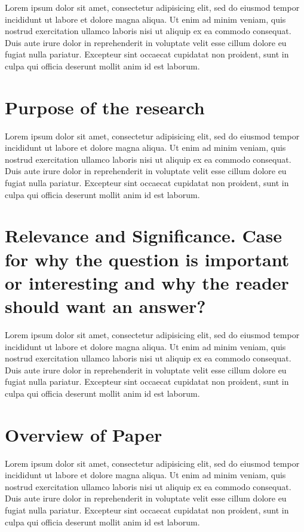 \documentclass[12pt,oneside,letterpaper,titlepage]{report}
\begin{document}
Lorem ipsum dolor sit amet, consectetur adipisicing elit, sed do eiusmod tempor incididunt ut labore et dolore magna aliqua. Ut enim ad minim veniam, quis nostrud exercitation ullamco laboris nisi ut aliquip ex ea commodo consequat. Duis aute irure dolor in reprehenderit in voluptate velit esse cillum dolore eu fugiat nulla pariatur. Excepteur sint occaecat cupidatat non proident, sunt in culpa qui officia deserunt mollit anim id est laborum.

\section{Purpose of the research}

Lorem ipsum dolor sit amet, consectetur adipisicing elit, sed do eiusmod tempor incididunt ut labore et dolore magna aliqua. Ut enim ad minim veniam, quis nostrud exercitation ullamco laboris nisi ut aliquip ex ea commodo consequat. Duis aute irure dolor in reprehenderit in voluptate velit esse cillum dolore eu fugiat nulla pariatur. Excepteur sint occaecat cupidatat non proident, sunt in culpa qui officia deserunt mollit anim id est laborum.

\section{Relevance and Significance. Case for why the question is important or interesting and why the reader should want an answer?
}

Lorem ipsum dolor sit amet, consectetur adipisicing elit, sed do eiusmod tempor incididunt ut labore et dolore magna aliqua. Ut enim ad minim veniam, quis nostrud exercitation ullamco laboris nisi ut aliquip ex ea commodo consequat. Duis aute irure dolor in reprehenderit in voluptate velit esse cillum dolore eu fugiat nulla pariatur. Excepteur sint occaecat cupidatat non proident, sunt in culpa qui officia deserunt mollit anim id est laborum.

\section{Overview of Paper}

Lorem ipsum dolor sit amet, consectetur adipisicing elit, sed do eiusmod tempor incididunt ut labore et dolore magna aliqua. Ut enim ad minim veniam, quis nostrud exercitation ullamco laboris nisi ut aliquip ex ea commodo consequat. Duis aute irure dolor in reprehenderit in voluptate velit esse cillum dolore eu fugiat nulla pariatur. Excepteur sint occaecat cupidatat non proident, sunt in culpa qui officia deserunt mollit anim id est laborum.
\end{document}
